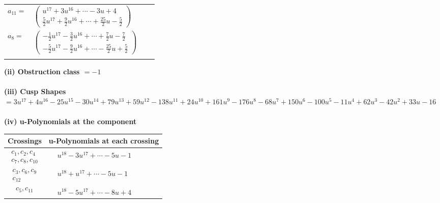 \documentclass[1p]{elsarticle_modified}
\theoremstyle{definition}
\begin{document}
\begin{tabular}{m{7pt} m{180pt} m{7pt} m{180pt} }
\flushright $a_{11}=$&$\begin{pmatrix}u^{17}+3 u^{16}+\cdots-3 u+4\\\frac{5}{2} u^{17}+\frac{9}{2} u^{16}+\cdots+\frac{25}{2} u-\frac{5}{2}\end{pmatrix}$ \\
\flushright $a_{8}=$&$\begin{pmatrix}-\frac{1}{2} u^{17}-\frac{3}{2} u^{16}+\cdots+\frac{7}{2} u-\frac{7}{2}\\-\frac{5}{2} u^{17}-\frac{9}{2} u^{16}+\cdots-\frac{25}{2} u+\frac{5}{2}\end{pmatrix}$\\&\end{tabular}
\flushleft \textbf{(ii) Obstruction class $= -1$}\\~\\
\flushleft \textbf{(iii) Cusp Shapes $= 3 u^{17}+4 u^{16}-25 u^{15}-30 u^{14}+79 u^{13}+59 u^{12}-138 u^{11}+24 u^{10}+161 u^9-176 u^8-68 u^7+150 u^6-100 u^5-11 u^4+62 u^3-42 u^2+33 u-16$}\\~\\
\newpage\renewcommand{\arraystretch}{1}
\flushleft \textbf{(iv) u-Polynomials at the component}\newline \\
\begin{tabular}{m{50pt}|m{274pt}}
Crossings & \hspace{64pt}u-Polynomials at each crossing \\
\hline $$\begin{aligned}c_{1},c_{2},c_{4}\\c_{7},c_{8},c_{10}\end{aligned}$$&$\begin{aligned}
&u^{18}-3 u^{17}+\cdots-5 u-1
\end{aligned}$\\
\hline $$\begin{aligned}c_{3},c_{6},c_{9}\\c_{12}\end{aligned}$$&$\begin{aligned}
&u^{18}+u^{17}+\cdots-5 u-1
\end{aligned}$\\
\hline $$\begin{aligned}c_{5},c_{11}\end{aligned}$$&$\begin{aligned}
&u^{18}-5 u^{17}+\cdots-8 u+4
\end{aligned}$\\
\hline
\end{tabular}\\~\\
\end{document}
